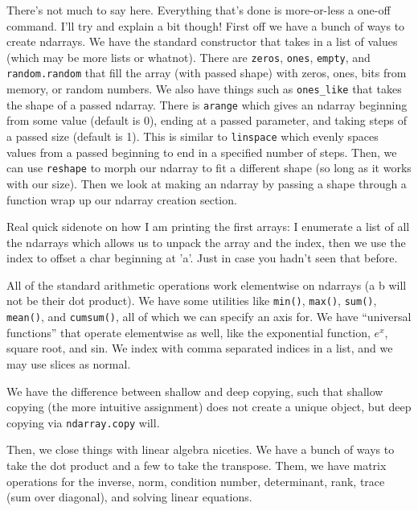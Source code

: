 \documentclass[12pt, twoside, reqno]{book}
\begin{document}
There's not much to say here. Everything that's done is more-or-less a one-off command. I'll try and explain a bit though! First off we have a bunch of ways to create ndarrays. We have the standard constructor that takes in a list of values (which may be more lists or whatnot). There are \texttt{zeros}, \texttt{ones}, \texttt{empty}, and \texttt{random.random} that fill the array (with passed shape) with zeros, ones, bits from memory, or random numbers. We also have things such as \texttt{ones\_like} that takes the shape of a passed ndarray. There is \texttt{arange} which gives an ndarray beginning from some value (default is 0), ending at a passed parameter, and taking steps of a passed size (default is 1). This is similar to \texttt{linspace} which evenly spaces values from a passed beginning to end in a specified number of steps. Then, we can use \texttt{reshape} to morph our ndarray to fit a different shape (so long as it works with our size). Then we look at making an ndarray by passing a shape through a function wrap up our ndarray creation section.

Real quick sidenote on how I am printing the first arrays: I enumerate a list of all the ndarrays which allows us to unpack the array and the index, then we use the index to offset a char beginning at 'a'. Just in case you hadn't seen that before.

All of the standard arithmetic operations work elementwise on ndarrays (a \textit{} b will not be their dot product). We have some utilities like \texttt{min()}, \texttt{max()}, \texttt{sum()}, \texttt{mean()}, and \texttt{cumsum()}, all of which we can specify an axis for. We have ``universal functions'' that operate elementwise as well, like the exponential function, $e^x$, square root, and sin. We index with comma separated indices in a list, and we may use slices as normal.

We have the difference between shallow and deep copying, such that shallow copying (the more intuitive assignment) does not create a unique object, but deep copying via \texttt{ndarray.copy} will.

Then, we close things with linear algebra niceties. We have a bunch of ways to take the dot product and a few to take the transpose. Them, we have matrix operations for the inverse, norm, condition number, determinant, rank, trace (sum over diagonal), and solving linear equations.
\end{document}
